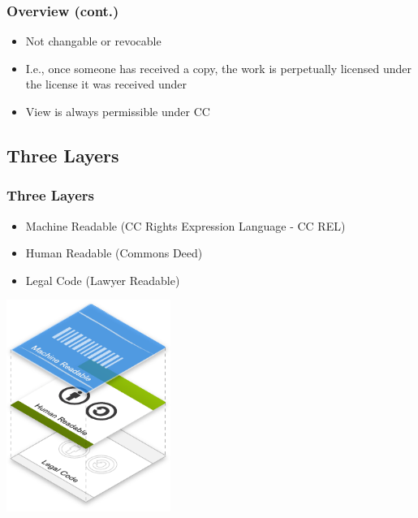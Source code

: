 \documentclass[mathserif,xcolor=dvipsnames,hyperref={bookmarks=true}]{beamer}
\begin{document}
    \begin{frame}[t]
        \frametitle{Overview (cont.)}
        \begin{itemize}
            \item Not changable or revocable
            \item I.e., once someone has received a copy, the work is perpetually licensed under the license it was received under
            \item View is always permissible under CC
        \end{itemize}
    \end{frame}

    \subsection{Three Layers}
    \begin{frame}[t]
        \frametitle{Three Layers}
            \begin{itemize}
                \item Machine Readable (CC Rights Expression Language - CC REL)
                \item Human Readable (Commons Deed)
                \item Legal Code (Lawyer Readable)
            \end{itemize}
        \begin{center}
          \includegraphics[width=0.4\textwidth]{figures/license_layers.png}
        \end{center}
    \end{frame}
\end{document}
